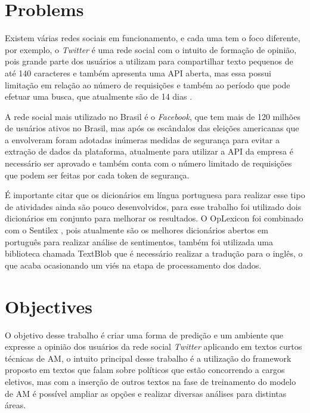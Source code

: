 %

\section{Problems}

Existem várias redes sociais em funcionamento, e cada uma tem o foco diferente, por exemplo, o \textit{Twitter} é uma rede social com o intuito de formação de opinião, pois
grande parte dos usuários a utilizam para compartilhar texto pequenos de até 140 caracteres e também apresenta uma \acrshort{API} aberta, mas essa possui limitação 
em relação ao número de requisições e também ao período que pode efetuar uma busca, que atualmente são de 14 dias \cite{Twitter}.

A rede social mais utilizado no Brasil é o \textit{Facebook}, que tem mais de 120 milhões de usuários ativos no Brasil\cite{EBC}, mas após os escândalos das eleições americanas que a envolveram \cite{face}
foram adotadas inúmeras medidas de segurança para evitar a extração de dados da plataforma, atualmente para utilizar a \acrshort{API} da empresa é necessário ser aprovado e também conta com o número limitado
de requisições que podem ser feitas por cada token de segurança.

É importante citar que os dicionários em língua portuguesa para realizar esse tipo de atividades ainda são pouco desenvolvidos, para esse trabalho foi utilizado dois dicionários em conjunto para melhorar 
os resultados. O OpLexicon \cite{souza} foi combinado com o Sentilex \cite{Neuenschwander}, pois atualmente são os melhores dicionários abertos em português para realizar análise de sentimentos, também foi utilizada
uma biblioteca chamada TextBlob \cite{textblob} que é necessário  realizar a tradução para o inglês, o que acaba ocasionando um viés na etapa de processamento dos dados.
\section{Objectives}

O objetivo desse trabalho é criar uma forma de predição e um ambiente que expresse a opinião dos usuários da rede social \textit{Twitter} aplicando em textos curtos técnicas de \acrshort{AM},
o intuito principal desse trabalho é a utilização do framework proposto em textos que falam sobre políticos que estão concorrendo a cargos eletivos, mas com a inserção de outros textos na fase de treinamento do modelo de \acrshort{AM} é possível
ampliar as opções e realizar diversas análises para distintas áreas.


